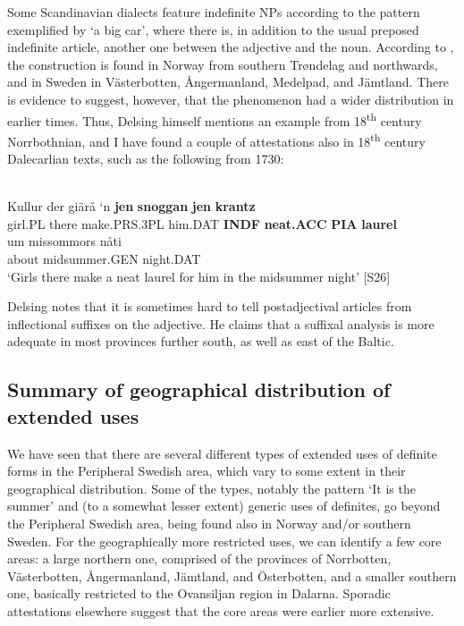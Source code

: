 Some Scandinavian dialects feature indefinite NPs according to the pattern exemplified by ‘a big car’, where there is, in addition to the usual preposed indefinite article, another one between the adjective and the noun. According to \citet[46]{Delsing2003a}, the construction is found in Norway from southern Trøndelag and northwards, and in Sweden in Västerbotten, Ångermanland, Medelpad, and Jämtland. There is evidence to suggest, however, that the phenomenon had a wider distribution in earlier times. Thus, Delsing himself mentions an example from 18\textsuperscript{th} century Norrbothnian, and I have found a couple of attestations also in 18\textsuperscript{th} century Dalecarlian texts, such as the following from 1730: 


\ea \label{} 
\\
\gll Kullur  der  giärå  ‘n  \textbf{jen} \textbf{snoggan} \textbf{jen} \textbf{krantz}\\
girl.PL  there  make.PRS.3PL  him.DAT  \textbf{INDF} \textbf{neat.ACC} \textbf{PIA} \textbf{laurel}\\
\gll um  missommors  nåti\\
about  midsummer.GEN  night.DAT\\
\glt ‘Girls there make a neat laurel for him in the midsummer night’ [S26]

\z

Delsing notes that it is sometimes hard to tell postadjectival articles from inflectional suffixes on the adjective. He claims that a suffixal analysis is more adequate in most provinces further south, as well as east of the Baltic. 


\subsection{ Summary of geographical distribution of extended uses}

We have seen that there are several different types of extended uses of definite forms in the Peripheral Swedish area, which vary to some extent in their geographical distribution. Some of the types, notably the pattern  ‘It is the summer’  and (to a somewhat lesser extent) generic uses of definites, go beyond the Peripheral Swedish area, being found also in Norway and/or southern Sweden. For the geographically more restricted uses, we can identify a few core areas: a large northern one, comprised of the provinces of Norrbotten, Västerbotten, Ångermanland, Jämtland, and Österbotten, and a smaller southern one, basically restricted to the Ovansiljan region in Dalarna. Sporadic attestations elsewhere suggest that the core areas were earlier more extensive.

